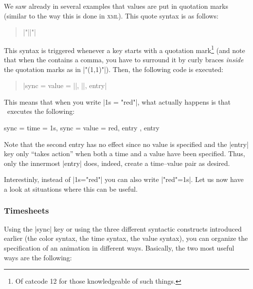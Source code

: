 We saw already in several examples that values are put in quotation
marks (similar to the way this is done in \textsc{xml}). This quote
syntax is as follows: 

\begin{quote}
  \normalfont
  |"||"| 
\end{quote}

This syntax is triggered whenever a key starts with a quotation
mark\footnote{Of catcode 12 for those knowledgeable of such
  things.} (and note that when the  contains a comma, you have to surround
it by curly braces \emph{inside} the quotation marks as in
|"{(1,1)}"|). Then, the following code is executed:
\begin{quote}
  \normalfont
  |sync = {value = ||, ||, entry}|
\end{quote}

This means that when you write |1s = "red"|, what actually happens is
that \tikzname\ executes the following:
\begin{codeexample}
sync = { time = 1s, sync = { value = red, entry }, entry }
\end{codeexample}
Note that the second entry has no effect since no value is specified
and the |entry| key only ``takes action'' when both a time and a value
have been specified. Thus, only the innermost |entry| does, indeed,
create a time--value pair as desired.

Interestinly, instead of |1s="red"| you can also write |"red"=1s|. Let
us now have a look at situations where this can be useful.


\subsubsection{Timesheets}

Using the |sync| key or using the three different syntactic constructs
introduced earlier (the color syntax, the time syntax, the value
syntax), you can organize the specification of an animation in
different ways. Basically, the two most useful ways are the following:

